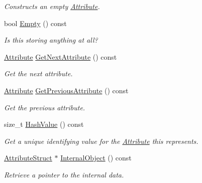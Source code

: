 \begin{DoxyCompactItemize}
\begin{DoxyCompactList}\small\item\em Constructs an empty \hyperlink{classphys_1_1xml_1_1Attribute}{Attribute}. \item\end{DoxyCompactList}\item 
bool \hyperlink{classphys_1_1xml_1_1Attribute_a6d0157a562f283e9c87d1cc46b3405cc}{Empty} () const 
\begin{DoxyCompactList}\small\item\em Is this storing anything at all? \item\end{DoxyCompactList}\item 
\hyperlink{classphys_1_1xml_1_1Attribute}{Attribute} \hyperlink{classphys_1_1xml_1_1Attribute_a602c51cb79ed0cc33bd898aefe77da70}{GetNextAttribute} () const 
\begin{DoxyCompactList}\small\item\em Get the next attribute. \item\end{DoxyCompactList}\item 
\hyperlink{classphys_1_1xml_1_1Attribute}{Attribute} \hyperlink{classphys_1_1xml_1_1Attribute_ae1c2320961faca954e7e34acc166f8d0}{GetPreviousAttribute} () const 
\begin{DoxyCompactList}\small\item\em Get the previous attribute. \item\end{DoxyCompactList}\item 
size\_\-t \hyperlink{classphys_1_1xml_1_1Attribute_ac0c27e07b705c41670a0903f4fe18378}{HashValue} () const 
\begin{DoxyCompactList}\small\item\em Get a unique identifying value for the \hyperlink{classphys_1_1xml_1_1Attribute}{Attribute} this represents. \item\end{DoxyCompactList}\item 
\hyperlink{classAttributeStruct}{AttributeStruct} $\ast$ \hyperlink{classphys_1_1xml_1_1Attribute_a1354d5f93309a999651e11b1cd4c2f62}{InternalObject} () const 
\begin{DoxyCompactList}\small\item\em Retrieve a pointer to the internal data. \item\end{DoxyCompactList}\item 

\end{DoxyCompactItemize}
